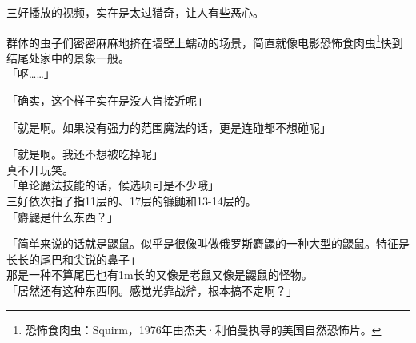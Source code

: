 三好播放的视频，实在是太过猎奇，让人有些恶心。

群体的虫子们密密麻麻地挤在墙壁上蠕动的场景，简直就像电影恐怖食肉虫\footnote{恐怖食肉虫：Squirm，1976年由杰夫·利伯曼执导的美国自然恐怖片。}快到结尾处家中的景象一般。\\

「呕……」

「确实，这个样子实在是没人肯接近呢」

「就是啊。如果没有强力的范围魔法的话，更是连碰都不想碰呢」

「就是啊。我还不想被吃掉呢」\\

真不开玩笑。\\

「单论魔法技能的话，候选项可是不少哦」\\

三好依次指了指11层的、17层的镰鼬和13-14层的。\\

「麝鼹是什么东西？」

「简单来说的话就是鼹鼠。似乎是很像叫做俄罗斯麝鼹的一种大型的鼹鼠。特征是长长的尾巴和尖锐的鼻子」\\

那是一种不算尾巴也有1m长的又像是老鼠又像是鼹鼠的怪物。\\

「居然还有这种东西啊。感觉光靠战斧，根本搞不定啊？」

